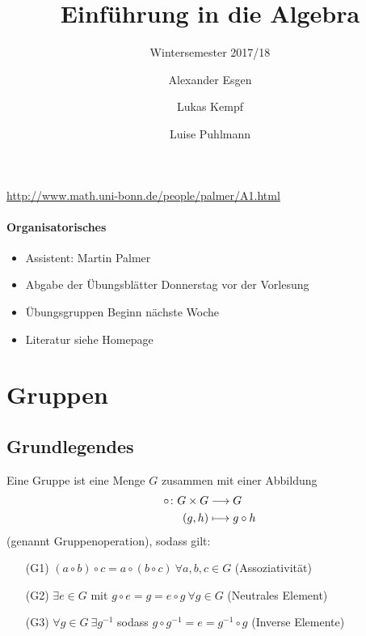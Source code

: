 \documentclass[12pt,a4paper]{scrartcl}
\author{Alexander Esgen \and Lukas Kempf \and Luise Puhlmann}
\title{Einführung in die Algebra}
\subtitle{Wintersemester 2017/18}
\begin{document}
\maketitle
\tableofcontents
\newpage


\url{http://www.math.uni-bonn.de/people/palmer/A1.html}

\paragraph {Organisatorisches}
\begin{itemize}
	\item Assistent: Martin Palmer
	\item Abgabe der Übungsblätter Donnerstag vor der Vorlesung
	\item Übungsgruppen Beginn nächste Woche
	\item Literatur siehe Homepage
\end{itemize}

\section{Gruppen}
\subsection{Grundlegendes} \label{ch:grp_basics}
\begin{defi} Eine Gruppe ist eine Menge $G$ zusammen mit einer Abbildung
\begin{align*}
	\circ\colon G\times G &\longrightarrow G\\
	 (g,h)&\longmapsto g\circ h
\end{align*}
(genannt Gruppenoperation), sodass gilt:
\begin{itemize}
	\item[(G1)]$(a\circ b)\circ c = a \circ (b\circ c) ~ \forall a,b,c\in G$ (Assoziativität)
	\item[(G2)] $\exists e\in G$ mit $g\circ e = g = e\circ g ~ \forall g\in G$ (Neutrales Element)
	\item[(G3)] $\forall g\in G\ \exists g^{-1}$ sodass $g\circ g^{-1} = e = g^{-1}\circ g$ (Inverse Elemente)
\end{itemize}
\end{defi}
\end{document}
